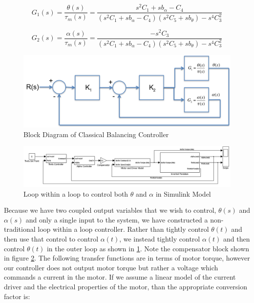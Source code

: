 \documentclass{article}
\theoremstyle{plain}
\theoremstyle{definition}
\theoremstyle{remark}
\begin{document}
\begin{equation}
 G_1(s) = \frac{\theta(s)}{\tau_{m}(s)} = \frac{s^2 C_1 + s b_{\alpha} - C_4}{\left(s^2C_1 + s b_{\alpha} - C_4 \right) \left(s^2 C_5  + s b_{\theta} \right) - s^4 C_3^2}
\label{thetaTF1}
\end{equation}

\begin{equation}
G_2(s) = \frac{\alpha(s)}{\tau_{m}(s)} = \frac{-s^2 C_3}{\left(s^2C_1 + s b_{\alpha} - C_4 \right) \left(s^2 C_5  + s b_{\theta} \right) - s^4 C_3^2}
\label{alphaTF2}
\end{equation}

\begin{figure}[hbt]
\begin{center}
\includegraphics[width = 15cm]{classicalBlockDesign.png}
\end{center}
\caption{Block Diagram of Classical Balancing Controller}
\label{classicalControllerBlock}
\end{figure}

\begin{figure}[hbt]
\begin{center}
\includegraphics[width = 17cm]{ClassicalControllerBlock.png}
\end{center}
\caption{Loop within a loop to control both $\theta$ and $\alpha$ in Simulink Model}
\label{classicalSimulink}
\end{figure}

Because we have two coupled output variables that we wish to control, $\theta(s)$ and $\alpha(s)$ and only a single input to the system, we have constructed a non-traditional loop within a loop controller.  Rather than tightly control $\theta(t)$ and then use that control to control $\alpha(t)$, we instead tightly control $\alpha(t)$ and then control $\theta(t)$ in the outer loop as shown in \ref{classicalControllerBlock}.  Note the compensator block shown in figure \ref{classicalSimulink}.  The following transfer functions are in terms of motor torque, however our controller does not output motor torque but rather a voltage which commands a current in the motor. If we assume a linear model of the current driver and the electrical properties of the motor, than the appropriate conversion factor is:
\end{document}
